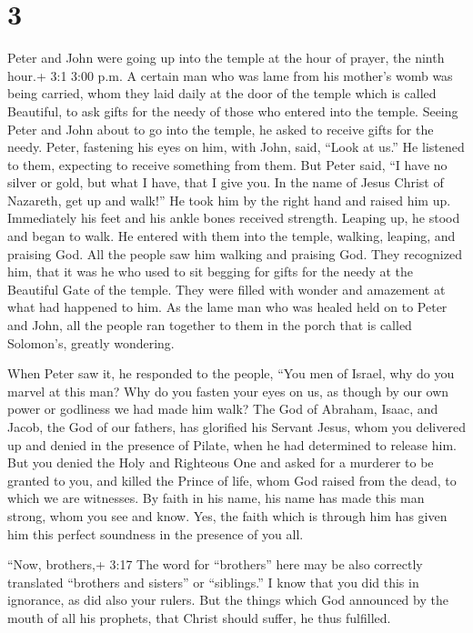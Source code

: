 \hypertarget{section-2}{%
\section{3}\label{section-2}}

 Peter and John were going up into the temple at the hour of
prayer, the ninth hour.+ 3:1 3:00 p.m.  A certain man who
was lame from his mother's womb was being carried, whom they laid daily
at the door of the temple which is called Beautiful, to ask gifts for
the needy of those who entered into the temple.  Seeing
Peter and John about to go into the temple, he asked to receive gifts
for the needy.  Peter, fastening his eyes on him, with John,
said, ``Look at us.''  He listened to them, expecting to
receive something from them.  But Peter said, ``I have no
silver or gold, but what I have, that I give you. In the name of Jesus
Christ of Nazareth, get up and walk!''  He took him by the
right hand and raised him up. Immediately his feet and his ankle bones
received strength.  Leaping up, he stood and began to walk.
He entered with them into the temple, walking, leaping, and praising
God.  All the people saw him walking and praising God.
 They recognized him, that it was he who used to sit
begging for gifts for the needy at the Beautiful Gate of the temple.
They were filled with wonder and amazement at what had happened to him.
 As the lame man who was healed held on to Peter and John,
all the people ran together to them in the porch that is called
Solomon's, greatly wondering.

 When Peter saw it, he responded to the people, ``You men
of Israel, why do you marvel at this man? Why do you fasten your eyes on
us, as though by our own power or godliness we had made him walk?
 The God of Abraham, Isaac, and Jacob, the God of our
fathers, has glorified his Servant Jesus, whom you delivered up and
denied in the presence of Pilate, when he had determined to release him.
 But you denied the Holy and Righteous One and asked for a
murderer to be granted to you,  and killed the Prince of
life, whom God raised from the dead, to which we are witnesses.
 By faith in his name, his name has made this man strong,
whom you see and know. Yes, the faith which is through him has given him
this perfect soundness in the presence of you all.

 ``Now, brothers,+ 3:17 The word for ``brothers'' here may
be also correctly translated ``brothers and sisters'' or ``siblings.'' I
know that you did this in ignorance, as did also your rulers.
 But the things which God announced by the mouth of all his
prophets, that Christ should suffer, he thus fulfilled.

